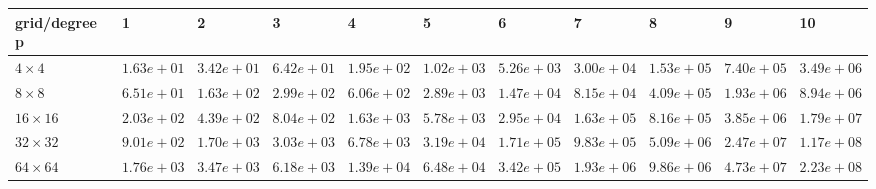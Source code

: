 \begin{tabular}{lllllllllll}
\hline
 grid/degree p   & 1          & 2          & 3          & 4          & 5          & 6          & 7          & 8          & 9          & 10         \\
\hline
 $4 \times 4$    & $1.63e+01$ & $3.42e+01$ & $6.42e+01$ & $1.95e+02$ & $1.02e+03$ & $5.26e+03$ & $3.00e+04$ & $1.53e+05$ & $7.40e+05$ & $3.49e+06$ \\
 $8 \times 8$    & $6.51e+01$ & $1.63e+02$ & $2.99e+02$ & $6.06e+02$ & $2.89e+03$ & $1.47e+04$ & $8.15e+04$ & $4.09e+05$ & $1.93e+06$ & $8.94e+06$ \\
 $16 \times 16$  & $2.03e+02$ & $4.39e+02$ & $8.04e+02$ & $1.63e+03$ & $5.78e+03$ & $2.95e+04$ & $1.63e+05$ & $8.16e+05$ & $3.85e+06$ & $1.79e+07$ \\
 $32 \times 32$  & $9.01e+02$ & $1.70e+03$ & $3.03e+03$ & $6.78e+03$ & $3.19e+04$ & $1.71e+05$ & $9.83e+05$ & $5.09e+06$ & $2.47e+07$ & $1.17e+08$ \\
 $64 \times 64$  & $1.76e+03$ & $3.47e+03$ & $6.18e+03$ & $1.39e+04$ & $6.48e+04$ & $3.42e+05$ & $1.93e+06$ & $9.86e+06$ & $4.73e+07$ & $2.23e+08$ \\
\hline
\end{tabular}